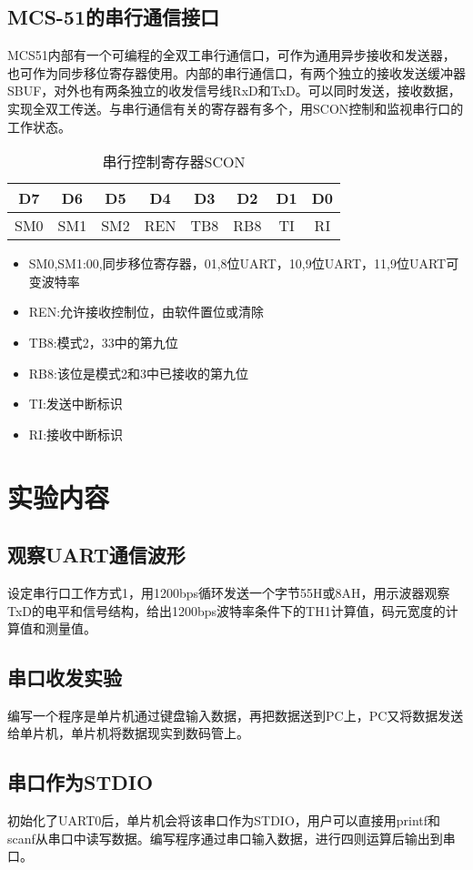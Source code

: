 \documentclass{article}
\begin{document}
\begin{CJK}{UTF8}{gkai}
\subsection{MCS-51的串行通信接口}
MCS51内部有一个可编程的全双工串行通信口，可作为通用异步接收和发送器，也可作为同步移位寄存器使用。内部的串行通信口，有两个独立的接收发送缓冲器SBUF，对外也有两条独立的收发信号线RxD和TxD。可以同时发送，接收数据，实现全双工传送。与串行通信有关的寄存器有多个，用SCON控制和监视串行口的工作状态。
\begin{table}
  \centering
  \caption{串行控制寄存器SCON}
  \begin{tabular}{|c|c|c|c|c|c|c|c|}
    \hline
    D7&D6&D5&D4&D3&D2&D1&D0\\
    \hline
    SM0&SM1&SM2&REN&TB8&RB8&TI&RI\\
    \hline
  \end{tabular}
\end{table}
\begin{itemize}
  \item SM0,SM1:00,同步移位寄存器，01,8位UART，10,9位UART，11,9位UART可变波特率
  \item REN:允许接收控制位，由软件置位或清除
  \item TB8:模式2，33中的第九位
  \item RB8:该位是模式2和3中已接收的第九位
  \item TI:发送中断标识
  \item RI:接收中断标识
\end{itemize}
\section{实验内容}
\subsection{观察UART通信波形}
设定串行口工作方式1，用1200bps循环发送一个字节55H或8AH，用示波器观察TxD的电平和信号结构，给出1200bps波特率条件下的TH1计算值，码元宽度的计算值和测量值。
\subsection{串口收发实验}
编写一个程序是单片机通过键盘输入数据，再把数据送到PC上，PC又将数据发送给单片机，单片机将数据现实到数码管上。
\subsection{串口作为STDIO}
初始化了UART0后，单片机会将该串口作为STDIO，用户可以直接用printf和scanf从串口中读写数据。编写程序通过串口输入数据，进行四则运算后输出到串口。



\end{CJK}
\end{document}
